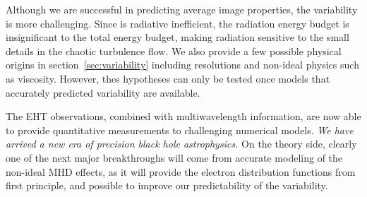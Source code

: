 Although we are successful in predicting average image properties, the
variability is more challenging.
Since \sgra is radiative inefficient, the radiation energy budget is
insignificant to the total energy budget, making radiation sensitive
to the small details in the chaotic turbulence flow.
We also provide a few possible physical origins in
section~\ref{sec:variability} including resolutions and non-ideal
physics such as viscosity.
However, thes hypotheses can only be tested once models that
accurately predicted variability are available.

The EHT observations, combined with multiwavelength information, are
now able to provide quantitative measurements to challenging numerical
models.
\emph{We have arrived a new era of precision black hole astrophysics.}
On the theory side, clearly one of the next major breakthroughs will
come from accurate modeling of the non-ideal MHD effects, as it will
provide the electron distribution functions from first principle, and
possible to improve our predictability of the variability.
